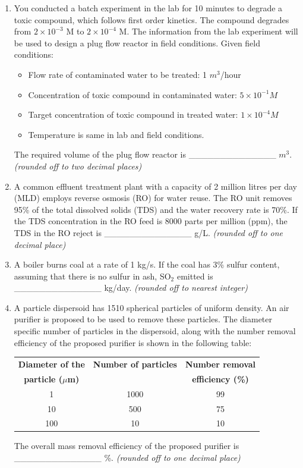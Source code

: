 \documentclass[journal]{IEEEtran}
\begin{document}
\begin{enumerate}[resume]
\item You conducted a batch experiment in the lab for 10 minutes to degrade a toxic compound, which follows first order kinetics. The compound degrades from $2 \times 10^{-3}$ M to $2 \times 10^{-4}$ M. The information from the lab experiment will be used to design a plug flow reactor in field conditions. Given field conditions:
\begin{itemize}
    \item Flow rate of contaminated water to be treated: 1 $m^3$/hour
    \item Concentration of toxic compound in contaminated water: $5 \times 10^{-1} M$
    \item Target concentration of toxic compound in treated water: $1 \times 10^{-4} M$
    \item Temperature is same in lab and field conditions.
\end{itemize}
The required volume of the plug flow reactor is \_\_\_\_\_\_\_\_\_\_\_\_\_\_ $m^3$. \textit{(rounded off to two decimal places)} \hfill{}

\item A common effluent treatment plant with a capacity of 2 million litres per day (MLD) employs reverse osmosis (RO) for water reuse. The RO unit removes 95\% of the total dissolved solids (TDS) and the water recovery rate is 70\%. If the TDS concentration in the RO feed is 8000 parts per million (ppm), the TDS in the RO reject is \_\_\_\_\_\_\_\_\_\_\_\_\_\_ g/L. \textit{(rounded off to one decimal place)} \hfill{}

\item A boiler burns coal at a rate of 1 kg/s. If the coal has 3\% sulfur content, assuming that there is no sulfur in ash, SO$_2$ emitted is \_\_\_\_\_\_\_\_\_\_\_\_\_\_ kg/day. \textit{(rounded off to nearest integer)}
\hfill{}

\item A particle dispersoid has 1510 spherical particles of uniform density. An air purifier is proposed to be used to remove these particles. The diameter specific number of particles in the dispersoid, along with the number removal efficiency of the proposed purifier is shown in the following table: \hfill{}
\begin{table}[H]
\centering
\begin{tabular}{|c|c|c|}
\hline
\textbf{Diameter of the} & \textbf{Number of particles} & \textbf{Number removal} \\
\textbf{particle ($\mu$m)} & & \textbf{efficiency (\%)} \\
\hline
1 & 1000 & 99 \\
10 & 500 & 75 \\
100 & 10 & 10 \\
\hline
\end{tabular}
\end{table}
The overall mass removal efficiency of the proposed purifier is \_\_\_\_\_\_\_\_\_\_\_\_\_\_ \%. \textit{(rounded off to one decimal place)}


\end{enumerate}
\end{document}
